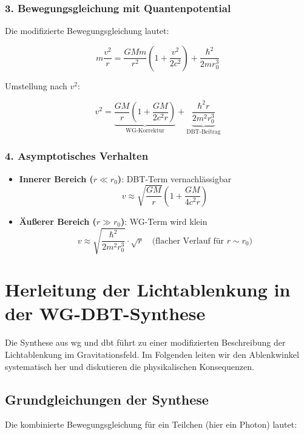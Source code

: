 \subsubsection{3. Bewegungsgleichung mit Quantenpotential}
Die modifizierte Bewegungsgleichung lautet:

\begin{equation}
m\frac{v^2}{r} = \frac{GMm}{r^2}\left(1 + \frac{v^2}{2c^2}\right) + \frac{\hbar^2}{2m r_0^3}
\end{equation}

Umstellung nach $v^2$:

\begin{equation}
    \boxed
    {
        v^2 = \underbrace{\frac{GM}{r}\left(1 + \frac{GM}{2c^2r}\right)}_{\text{WG-Korrektur}} + \underbrace{\frac{\hbar^2 r}{2m^2 r_0^3}}_{\text{DBT-Beitrag}}
    }
\end{equation}

\subsubsection{4. Asymptotisches Verhalten}
\begin{itemize}
\item \textbf{Innerer Bereich ($r \ll r_0$)}: DBT-Term vernachlässigbar
\begin{equation}
v \approx \sqrt{\frac{GM}{r}} \left(1 + \frac{GM}{4c^2r}\right)
\end{equation}

\item \textbf{Äußerer Bereich ($r \gg r_0$)}: WG-Term wird klein
\begin{equation}
v \approx \sqrt{\frac{\hbar^2}{2m^2 r_0^3}} \cdot \sqrt{r} \quad \text{(flacher Verlauf für $r \sim r_0$)}
\end{equation}
\end{itemize}

\newpage
\section{Herleitung der Lichtablenkung in der WG-DBT-Synthese}
\label{sec:lichtablenkung}

Die Synthese aus \gls{wg} und \gls{dbt} führt zu einer modifizierten Beschreibung der Lichtablenkung im Gravitationsfeld. Im Folgenden leiten wir den Ablenkwinkel systematisch her
und diskutieren die physikalischen Konsequenzen.

\subsection{Grundgleichungen der Synthese}
Die kombinierte Bewegungsgleichung für ein Teilchen (hier ein Photon) lautet:

